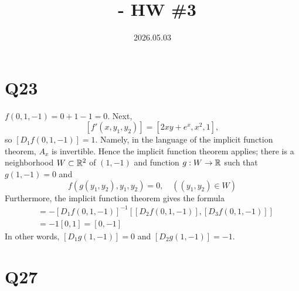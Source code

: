 \documentclass[12pt]{article}
\title{\course\ - HW \#3}
\author{\myname}
\date{2026.05.03}
\begin{document}
\maketitle
\thispagestyle{fancy}


\newcommand{\Djf}[3]{[D_{#1}#2(#3)]}
\newcommand{\grad}[1]{[\nabla #1]}

\section*{Q23} 
$f(0, 1, -1) = 0 + 1 - 1 = 0$. 
Next, 
$$[f'(x, y_1, y_2)] = [2xy + e^x, x^2, 1 ],$$
so $\Djf{1}{f}{0, 1, -1} = 1$.
Namely, in the language of the implicit function theorem, $A_x$ is invertible. 
Hence the implicit function theorem applies; 
there is a neighborhood $W \subset \mathbb{R}^2$ of $(1, -1)$ and function $g: W \rightarrow \mathbb{R}$ such that $g(1, -1) = 0$ and  
$$f(g(y_1, y_2), y_1, y_2) = 0, \quad ((y_1, y_2) \in W)$$
Furthermore, the implicit function theorem gives the formula 
\begin{align*}
  [g'(1, -1)] & = -\Djf{1}{f}{0, 1, -1}^{-1} [\Djf{2}{f}{0, 1, -1}, \Djf{3}{f}{0, 1, -1}]  \\ 
              & = -1[0, 1] = [0, -1]
\end{align*}
In other words, $\Djf{1}{g}{1, -1} = 0$ and $\Djf{2}{g}{1, -1} = -1$. 

\section*{Q27}
\end{document}
